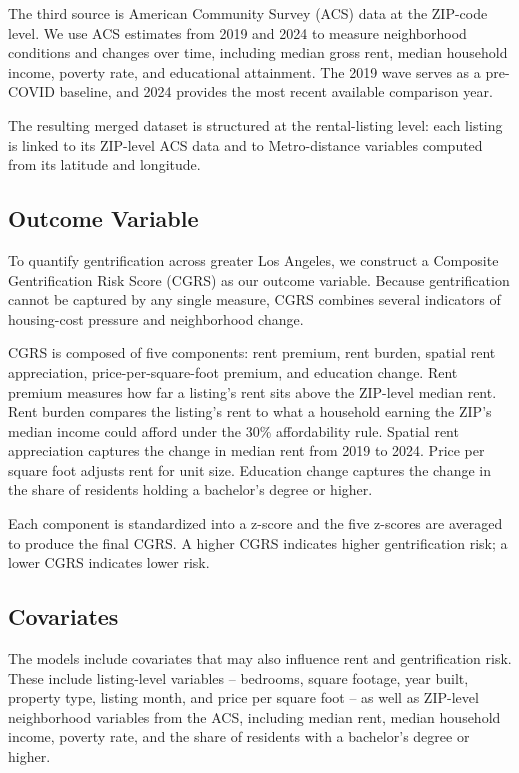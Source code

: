 \documentclass[11pt]{article}
\begin{document}
The third source is American Community Survey (ACS) data at the ZIP-code level. We use ACS estimates from 2019 and 2024 to measure neighborhood conditions and changes over time, including median gross rent, median household income, poverty rate, and educational attainment. The 2019 wave serves as a pre-COVID baseline, and 2024 provides the most recent available comparison year.

The resulting merged dataset is structured at the rental-listing level: each listing is linked to its ZIP-level ACS data and to Metro-distance variables computed from its latitude and longitude.

\subsection{Outcome Variable}

To quantify gentrification across greater Los Angeles, we construct a Composite Gentrification Risk Score (CGRS) as our outcome variable. Because gentrification cannot be captured by any single measure, CGRS combines several indicators of housing-cost pressure and neighborhood change.

CGRS is composed of five components: rent premium, rent burden, spatial rent appreciation, price-per-square-foot premium, and education change. Rent premium measures how far a listing's rent sits above the ZIP-level median rent. Rent burden compares the listing's rent to what a household earning the ZIP's median income could afford under the 30\% affordability rule. Spatial rent appreciation captures the change in median rent from 2019 to 2024. Price per square foot adjusts rent for unit size. Education change captures the change in the share of residents holding a bachelor's degree or higher.

Each component is standardized into a z-score and the five z-scores are averaged to produce the final CGRS. A higher CGRS indicates higher gentrification risk; a lower CGRS indicates lower risk.

\subsection{Covariates}

The models include covariates that may also influence rent and gentrification risk. These include listing-level variables -- bedrooms, square footage, year built, property type, listing month, and price per square foot -- as well as ZIP-level neighborhood variables from the ACS, including median rent, median household income, poverty rate, and the share of residents with a bachelor's degree or higher.
\end{document}
